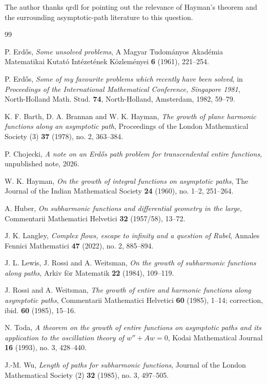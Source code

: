 \documentclass[11pt]{article}
\begin{document}
The author thanks qrdl for pointing out the relevance of Hayman's theorem and
the surrounding asymptotic-path literature to this question.

\begin{thebibliography}{99}

P. Erd\H{o}s,
\emph{Some unsolved problems},
A Magyar Tudom\'{a}nyos Akad\'{e}mia Matematikai Kutat\'{o} Int\'{e}zet\'{e}nek
K\"ozlem\'{e}nyei \textbf{6} (1961), 221--254.

P. Erd\H{o}s,
\emph{Some of my favourite problems which recently have been solved},
in \emph{Proceedings of the International Mathematical Conference, Singapore
1981}, North-Holland Math. Stud. \textbf{74}, North-Holland, Amsterdam, 1982,
59--79.

K. F. Barth, D. A. Brannan and W. K. Hayman,
\emph{The growth of plane harmonic functions along an asymptotic path},
Proceedings of the London Mathematical Society (3) \textbf{37} (1978),
no. 2, 363--384.

P. Chojecki,
\emph{A note on an Erd\H{o}s path problem for transcendental entire functions},
unpublished note, 2026.

W. K. Hayman,
\emph{On the growth of integral functions on asymptotic paths},
The Journal of the Indian Mathematical Society \textbf{24} (1960),
no. 1--2, 251--264.

A. Huber,
\emph{On subharmonic functions and differential geometry in the large},
Commentarii Mathematici Helvetici \textbf{32} (1957/58), 13--72.

J. K. Langley,
\emph{Complex flows, escape to infinity and a question of Rubel},
Annales Fennici Mathematici \textbf{47} (2022), no. 2, 885--894.

J. L. Lewis, J. Rossi and A. Weitsman,
\emph{On the growth of subharmonic functions along paths},
Arkiv f\"or Matematik \textbf{22} (1984), 109--119.

J. Rossi and A. Weitsman,
\emph{The growth of entire and harmonic functions along asymptotic paths},
Commentarii Mathematici Helvetici \textbf{60} (1985), 1--14;
correction, ibid. \textbf{60} (1985), 15--16.

N. Toda,
\emph{A theorem on the growth of entire functions on asymptotic paths and its
application to the oscillation theory of \(w''+Aw=0\)},
Kodai Mathematical Journal \textbf{16} (1993), no. 3, 428--440.

J.-M. Wu,
\emph{Length of paths for subharmonic functions},
Journal of the London Mathematical Society (2) \textbf{32} (1985),
no. 3, 497--505.

\end{thebibliography}
\end{document}
